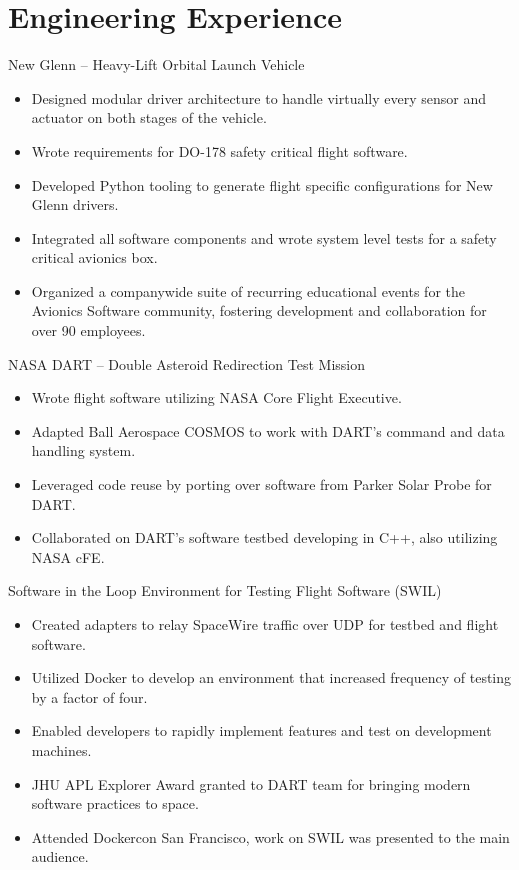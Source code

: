 \documentclass[10pt,final,sans]{resume}
\begin{document}
\section{Engineering Experience}

New Glenn -- Heavy-Lift Orbital Launch Vehicle
\begin{itemize}
  \item Designed modular driver architecture to handle virtually every sensor and actuator on both stages of the vehicle.
  \item Wrote requirements for DO-178 safety critical flight software.
  \item Developed Python tooling to generate flight specific configurations for New Glenn drivers.
  \item Integrated all software components and wrote system level tests for a safety critical avionics box.
  \item Organized a companywide suite of recurring educational events for the Avionics Software community, fostering development and collaboration for over 90 employees.
\end{itemize}
NASA DART -- Double Asteroid Redirection Test Mission
\begin{itemize}
  \item Wrote flight software utilizing NASA Core Flight Executive.
  \item Adapted Ball Aerospace COSMOS to work with DART's command and data handling system.
  \item Leveraged code reuse by porting over software from Parker Solar Probe for DART.
  \item Collaborated on DART's software testbed developing in C++, also utilizing NASA cFE.
\end{itemize} 
Software in the Loop Environment for Testing Flight Software (SWIL)
\begin{itemize}
  \item Created adapters to relay SpaceWire traffic over UDP for testbed and flight software.
  \item Utilized Docker to develop an environment that increased frequency of testing by a factor of four.
  \item Enabled developers to rapidly implement features and test on development machines.
  \item JHU APL Explorer Award granted to DART team for bringing modern software practices to space.
  \item Attended Dockercon San Francisco, work on SWIL was presented to the main audience.
\end{itemize}
\end{document}
